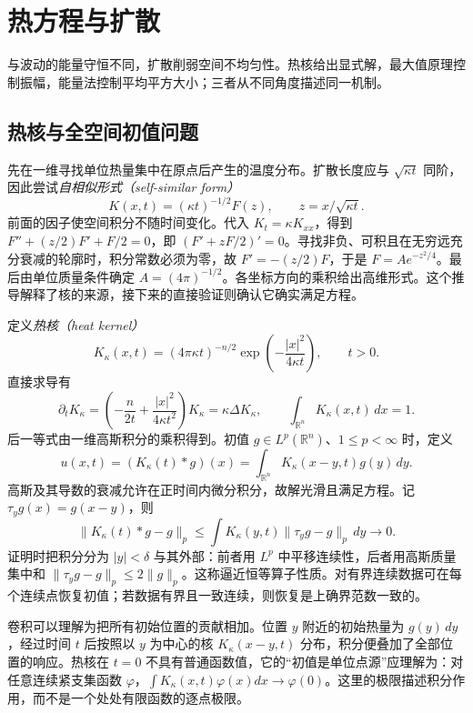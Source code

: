 \setcounter{chapter}{8} %
\chapter{热方程与扩散}
\label{chap:heat}

与波动的能量守恒不同，扩散削弱空间不均匀性。热核给出显式解，最大值原理控制振幅，能量法控制平均平方大小；三者从不同角度描述同一机制。

\section{热核与全空间初值问题}
先在一维寻找单位热量集中在原点后产生的温度分布。扩散长度应与 $\sqrt{\kappa t}$ 同阶，因此尝试\emph{自相似形式（self-similar form）}
\[
 K(x,t)=(\kappa t)^{-1/2}F(z),\qquad z=x/\sqrt{\kappa t}.
\]
前面的因子使空间积分不随时间变化。代入 $K_t=\kappa K_{xx}$，得到 $F''+(z/2)F'+F/2=0$，即 $(F'+zF/2)'=0$。寻找非负、可积且在无穷远充分衰减的轮廓时，积分常数必须为零，故 $F'=-(z/2)F$，于是 $F=Ae^{-z^2/4}$。最后由单位质量条件确定 $A=(4\pi)^{-1/2}$。各坐标方向的乘积给出高维形式。这个推导解释了核的来源，接下来的直接验证则确认它确实满足方程。

定义\emph{热核（heat kernel）}
\begin{equation}
 K_\kappa(x,t)=(4\pi\kappa t)^{-n/2}\exp\left(-\frac{|x|^2}{4\kappa t}\right),\qquad t>0.
 \label{eq:heat-kernel}
\end{equation}
直接求导有
\[
 \partial_tK_\kappa=\left(-\frac n{2t}+\frac{|x|^2}{4\kappa t^2}\right)K_\kappa
 =\kappa\Delta K_\kappa,
 \qquad \int_{\mathbb R^n}K_\kappa(x,t)\,dx=1.
\]
后一等式由一维高斯积分的乘积得到。初值 $g\in L^p(\mathbb R^n)$、$1\le p<\infty$ 时，定义
\begin{equation}
 u(x,t)=(K_\kappa(t)*g)(x)=\int_{\mathbb R^n}K_\kappa(x-y,t)g(y)\,dy.
 \label{eq:heat-convolution}
\end{equation}
高斯及其导数的衰减允许在正时间内微分积分，故解光滑且满足方程。记 $\tau_y g(x)=g(x-y)$，则
\[
 \|K_\kappa(t)*g-g\|_p
 \le\int K_\kappa(y,t)\|\tau_y g-g\|_p\,dy\longrightarrow0.
\]
证明时把积分分为 $|y|<\delta$ 与其外部：前者用 $L^p$ 中平移连续性，后者用高斯质量集中和 $\|\tau_yg-g\|_p\le2\|g\|_p$。这称逼近恒等算子性质。对有界连续数据可在每个连续点恢复初值；若数据有界且一致连续，则恢复是上确界范数一致的。

卷积可以理解为把所有初始位置的贡献相加。位置 $y$ 附近的初始热量为 $g(y)\,dy$，经过时间 $t$ 后按照以 $y$ 为中心的核 $K_\kappa(x-y,t)$ 分布，积分便叠加了全部位置的响应。热核在 $t=0$ 不具有普通函数值，它的“初值是单位点源”应理解为：对任意连续紧支集函数 $\varphi$，$\int K_\kappa(x,t)\varphi(x)dx\to\varphi(0)$。这里的极限描述积分作用，而不是一个处处有限函数的逐点极限。

